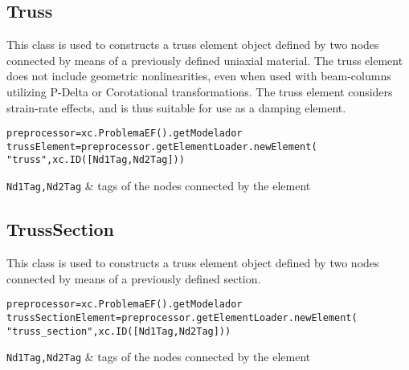 \subsection{Truss}
This class is used to constructs a truss element object defined by two nodes connected by means of a previously defined uniaxial material.
The truss element does not include geometric nonlinearities, even when used with beam-columns utilizing P-Delta or Corotational transformations.
The truss element considers strain-rate effects, and is thus suitable for use as a damping element. 
\begin{verbatim}
preprocessor=xc.ProblemaEF().getModelador
trussElement=preprocessor.getElementLoader.newElement(
"truss",xc.ID([Nd1Tag,Nd2Tag]))
\end{verbatim}
\begin{paramFuncTable}
{\tt Nd1Tag,Nd2Tag} & tags of the nodes connected by the element\\
\end{paramFuncTable}

\begin{paramClassTable}
\ElementParam{}
\ElementOneDParam{}
\end{paramClassTable}

\begin{methodsTable}
\ElementMeth{}
\ElementOneDMeth{}
\ProtoTrussMeth{}
\TrussBaseMeth{}
\TrussMeth{}
\end{methodsTable}


\subsection{TrussSection}
This class is used to constructs a truss element object defined by two nodes connected by means of a previously defined section.
\begin{verbatim}
preprocessor=xc.ProblemaEF().getModelador
trussSectionElement=preprocessor.getElementLoader.newElement(
"truss_section",xc.ID([Nd1Tag,Nd2Tag]))
\end{verbatim}
\begin{paramFuncTable}
{\tt Nd1Tag,Nd2Tag} & tags of the nodes connected by the element\\
\end{paramFuncTable}

\begin{paramClassTable}
\ElementParam{}
\ElementOneDParam{}
\end{paramClassTable}

\begin{methodsTable}
\ElementMeth{}
\ElementOneDMeth{}
\ProtoTrussMeth{}
\TrussBaseMeth{}
\end{methodsTable}

